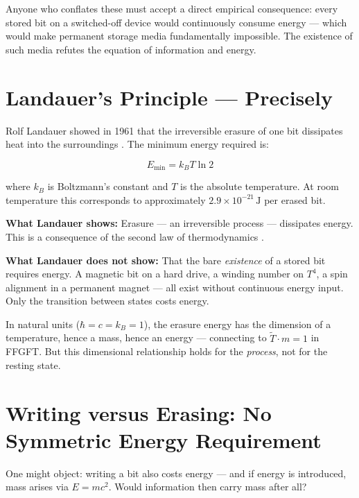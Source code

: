 Anyone who conflates these must accept a direct empirical consequence: every
stored bit on a switched-off device would continuously consume energy —
which would make permanent storage media fundamentally impossible. The
existence of such media refutes the equation of information and energy.

\section{Landauer's Principle — Precisely}

Rolf Landauer showed in 1961 that the irreversible erasure of one bit
dissipates heat into the surroundings \cite{Landauer1961}. The minimum
energy required is:

\begin{equation}
  E_{\min} = k_B T \ln 2
\end{equation}

where $k_B$ is Boltzmann's constant and $T$ is the absolute temperature.
At room temperature this corresponds to approximately
$2.9 \times 10^{-21}\,\text{J}$ per erased bit.

\textbf{What Landauer shows:} Erasure — an irreversible process — dissipates
energy. This is a consequence of the second law of thermodynamics
\cite{Bennett1982}.

\textbf{What Landauer does not show:} That the bare \emph{existence} of
a stored bit requires energy. A magnetic bit on a hard drive, a winding
number on $T^4$, a spin alignment in a permanent magnet — all exist
without continuous energy input. Only the transition between states costs
energy.

In natural units ($\hbar = c = k_B = 1$), the erasure energy has the
dimension of a temperature, hence a mass, hence an energy — connecting to
$\tilde{T} \cdot m = 1$ in FFGFT. But this dimensional relationship holds
for the \emph{process}, not for the resting state.

\section{Writing versus Erasing: No Symmetric Energy Requirement}

One might object: writing a bit also costs energy — and if energy is
introduced, mass arises via $E = mc^2$. Would information then carry mass
after all?

